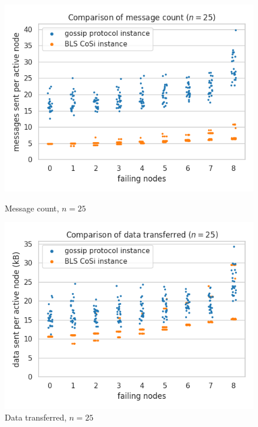 \begin{figure}[H]
    \centering
    \begin{minipage}{0.5\textwidth}
        \centering
        \includegraphics[width=\textwidth]{figures/1/bandwidth_msg_tx_sum_25.png}
        \captionsetup{labelformat=empty}
        \caption{Message count, $n = 25$}
    \end{minipage}\hfill
    \begin{minipage}{0.5\textwidth}
        \centering
        \includegraphics[width=\textwidth]{figures/1/bandwidth_tx_sum_25.png}
        \captionsetup{labelformat=empty}
        \caption{Data transferred, $n = 25$}
    \end{minipage}\hfill
\end{figure}


